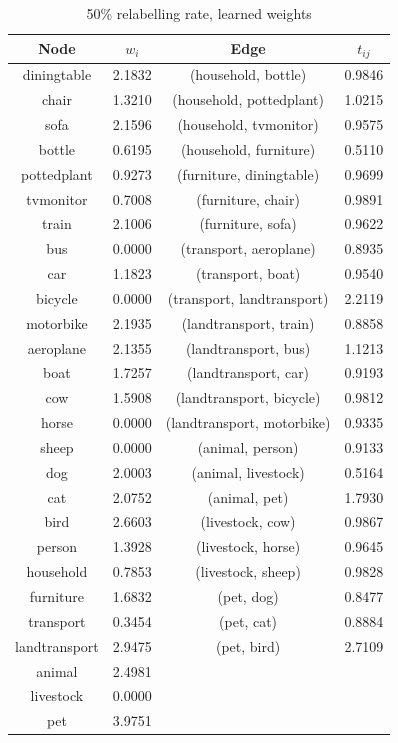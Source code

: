 \documentclass[11pt,a4paper]{article}
\begin{document}
\begin{table}[htbp]
\centering
\begin{tabular}{c|c|c|c}
Node & $w_i$ & Edge & $t_{ij}$\\\hline
diningtable   & 2.1832 & (household, bottle)        & 0.9846\\
chair         & 1.3210 & (household, pottedplant)   & 1.0215\\
sofa          & 2.1596 & (household, tvmonitor)     & 0.9575\\
bottle        & 0.6195 & (household, furniture)     & 0.5110\\
pottedplant   & 0.9273 & (furniture, diningtable)   & 0.9699\\
tvmonitor     & 0.7008 & (furniture, chair)         & 0.9891\\
train         & 2.1006 & (furniture, sofa)          & 0.9622\\
bus           & 0.0000 & (transport, aeroplane)     & 0.8935\\
car           & 1.1823 & (transport, boat)          & 0.9540\\
bicycle       & 0.0000 & (transport, landtransport) & 2.2119\\
motorbike     & 2.1935 & (landtransport, train)     & 0.8858\\
aeroplane     & 2.1355 & (landtransport, bus)       & 1.1213\\
boat          & 1.7257 & (landtransport, car)       & 0.9193\\
cow           & 1.5908 & (landtransport, bicycle)   & 0.9812\\
horse         & 0.0000 & (landtransport, motorbike) & 0.9335\\
sheep         & 0.0000 & (animal, person)           & 0.9133\\
dog           & 2.0003 & (animal, livestock)        & 0.5164\\
cat           & 2.0752 & (animal, pet)              & 1.7930\\
bird          & 2.6603 & (livestock, cow)           & 0.9867\\
person        & 1.3928 & (livestock, horse)         & 0.9645\\
household     & 0.7853 & (livestock, sheep)         & 0.9828\\
furniture     & 1.6832 & (pet, dog)                 & 0.8477\\
transport     & 0.3454 & (pet, cat)                 & 0.8884\\
landtransport & 2.9475 & (pet, bird)                & 2.7109\\
animal        & 2.4981 & &\\
livestock     & 0.0000 & &\\
pet           & 3.9751 & &
\end{tabular}
\caption{50\% relabelling rate, learned weights}
\label{tab:50weight}
\end{table}
\end{document}
